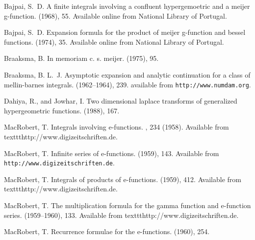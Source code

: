 \documentclass[11pt]{article}
\begin{document}
\begin{thebibliography}{10}

{\sc Bajpai, S.~D.}
\newblock A finite integrals involving a confluent hypergemoetric and a meijer
  g-function.
 (1968), 55.
\newblock Available online from National Library of Portugal.

{\sc Bajpai, S.~D.}
\newblock Expansion formula for the product of meijer g-function and bessel
  functions.
 (1974), 35.
\newblock Available online from National Library of Portugal.

{\sc Braaksma, B.}
\newblock In memoriam c. s. meijer.
 (1975), 95.

{\sc Braaksma, B. L.~J.}
\newblock Asymptotic expansion and analytic continuation for a class of
  mellin-barnes integrals.
 (1962--1964), 239.
\newblock available from \texttt{http://www.numdam.org}.

{\sc Dahiya, R., and Jowhar, I.}
\newblock Two dimensional laplace transforms of generalized hypergeometric
  functions.
 (1988), 167.

{\sc MacRobert, T.}
\newblock Integrals involving e-functions.
, 234 (1958).
\newblock Available from texttt{http://www.digizeitschriften.de}.

{\sc MacRobert, T.}
\newblock Infinite series of e-functions.
 (1959), 143.
\newblock Available from \texttt{http://www.digizeitschriften.de}.

{\sc MacRobert, T.}
\newblock Integrals of products of e-functions.
 (1959), 412.
\newblock Available from texttt{http://www.digizeitschriften.de}.

{\sc MacRobert, T.}
\newblock The multiplication formula for the gamma function and e-function
  series.
 (1959--1960), 133.
\newblock Available from texttt{http://www.digizeitschriften.de}.

{\sc MacRobert, T.}
\newblock Recurrence formulae for the e-functions.
 (1960), 254.


\end{thebibliography}
\end{document}

